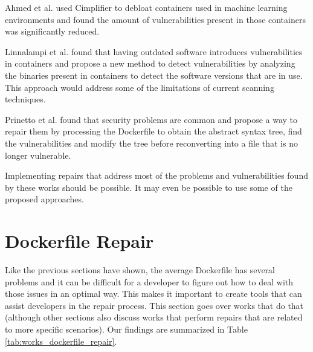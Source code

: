 Ahmed et al. \cite{ahmedSecurityAnalysisCode2022} used Cimplifier \cite{rastogiCimplifierAutomaticallyDebloating2017} to debloat containers used in machine learning environments and found the amount of vulnerabilities present in those containers was significantly reduced.

Linnalampi et al. \cite{linnalampiOutdatedSoftwareContainer2021} found that having outdated software introduces vulnerabilities in containers and propose a new method to detect vulnerabilities by analyzing the binaries present in containers to detect the software versions that are in use. This approach would address some of the limitations of current scanning techniques.

Prinetto et al. \cite{prinettoSecurityMisconfigurationsDetection} found that security problems are common and propose a way to repair them by processing the Dockerfile to obtain the abstract syntax tree, find the vulnerabilities and modify the tree before reconverting into a file that is no longer vulnerable.

Implementing repairs that address most of the problems and vulnerabilities found by these works should be possible. It may even be possible to use some of the proposed approaches.

\section{Dockerfile Repair} \label{sec:dockerfile_repair}

Like the previous sections have shown, the average Dockerfile has several problems and it can be difficult for a developer to figure out how to deal with those issues in an optimal way. This makes it important to create tools that can assist developers in the repair process. This section goes over works that do that (although other sections also discuss works that perform repairs that are related to more specific scenarios). Our findings are summarized in Table \ref{tab:works_dockerfile_repair}.

